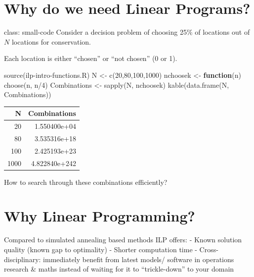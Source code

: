 \documentclass[
]{article}
\newenvironment{Shaded}{\begin{snugshade}}{\end{snugshade}}
\newcommand{\ControlFlowTok}[1]{\textcolor[rgb]{0.13,0.29,0.53}{\textbf{#1}}}
\newcommand{\DecValTok}[1]{\textcolor[rgb]{0.00,0.00,0.81}{#1}}
\newcommand{\FunctionTok}[1]{\textcolor[rgb]{0.00,0.00,0.00}{#1}}
\newcommand{\NormalTok}[1]{#1}
\newcommand{\OtherTok}[1]{\textcolor[rgb]{0.56,0.35,0.01}{#1}}
\newcommand{\SpecialCharTok}[1]{\textcolor[rgb]{0.00,0.00,0.00}{#1}}
\newcommand{\StringTok}[1]{\textcolor[rgb]{0.31,0.60,0.02}{#1}}
\begin{document}
\hypertarget{why-do-we-need-linear-programs}{%
\section{Why do we need Linear
Programs?}\label{why-do-we-need-linear-programs}}

class: small-code Consider a decision problem of choosing 25\% of
locations out of \(N\) locations for conservation.

Each location is either ``chosen'' or ``not chosen'' (0 or 1).

\begin{Shaded}
\begin{Highlighting}[]
\FunctionTok{source}\NormalTok{(}\StringTok{\textquotesingle{}ilp{-}intro{-}functions.R\textquotesingle{}}\NormalTok{)}
\NormalTok{N }\OtherTok{\textless{}{-}} \FunctionTok{c}\NormalTok{(}\DecValTok{20}\NormalTok{,}\DecValTok{80}\NormalTok{,}\DecValTok{100}\NormalTok{,}\DecValTok{1000}\NormalTok{)}
\NormalTok{nchoosek }\OtherTok{\textless{}{-}} \ControlFlowTok{function}\NormalTok{(n) }\FunctionTok{choose}\NormalTok{(n, n}\SpecialCharTok{/}\DecValTok{4}\NormalTok{)}
\NormalTok{Combinations }\OtherTok{\textless{}{-}} \FunctionTok{sapply}\NormalTok{(N, nchoosek)}
\FunctionTok{kable}\NormalTok{(}\FunctionTok{data.frame}\NormalTok{(N, Combinations))}
\end{Highlighting}
\end{Shaded}

\begin{longtable}[]{@{}rr@{}}
\toprule
N & Combinations \\
\midrule
\endhead
20 & 1.550400e+04 \\
80 & 3.535316e+18 \\
100 & 2.425193e+23 \\
1000 & 4.822840e+242 \\
\bottomrule
\end{longtable}

How to search through these combinations efficiently?

\hypertarget{why-linear-programming}{%
\section{Why Linear Programming?}\label{why-linear-programming}}

Compared to simulated annealing based methods ILP offers: - Known
solution quality (known gap to optimality) - Shorter computation time -
Cross-disciplinary: immediately benefit from latest models/ software in
operations research \& maths instead of waiting for it to
``trickle-down'' to your domain
\end{document}
